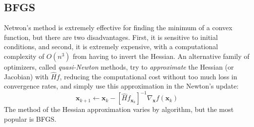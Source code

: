 \subsection{BFGS}

  Netwon's method is extremely effective for finding the minimum of a convex function, but there are two disadvantages. First, it is sensitive to initial conditions, and second, it is extremely expensive, with a computational complexity of $O(n^3)$ from having to invert the Hessian. An alternative family of optimizers, called \textit{quasi-Newton} methods, try to \textit{approximate} the Hessian (or Jacobian) with $\hat{H} f$, reducing the computational cost without too much loss in convergence rates, and simply use this approximation in the Newton's update: 
  \[\mathbf{x}_{k+1} \gets \mathbf{x}_k - [\hat{H} f_{\mathbf{x}_k}]^{-1} \nabla_\mathbf{x} f (\mathbf{x}_k)\]
  The method of the Hessian approximation varies by algorithm, but the most popular is BFGS. 

